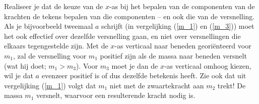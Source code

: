 \begin{exercise}
\begin{oplossing}
Realiseer je dat de keuze van de $x$-as bij het bepalen van de componenten van de krachten de tekens bepalen van die componenten -- en ook die van de versnelling. Als je bijvoorbeeld tweemaal $a$ schrijft (in vergelijking (\ref{m_1}) en (\ref{m_3})) moet het ook effectief over dezelfde versnelling gaan, en niet over versnellingen die elkaars tegengestelde zijn. Met de $x$-as verticaal naar beneden geori\"enteerd voor $m_1$, zal de versnelling voor $m_1$ positief zijn als de massa naar beneden versnelt (wat hij doet; $m_1>m_3$). Voor $m_3$ moet je dan de $x$-as verticaal omhoog kiezen, wil je dat $a$ evenzeer positief is of dus dezelfde betekenis heeft.
\newline
\newline
Zie ook dat uit vergelijking (\ref{m_1}) volgt dat $m_1$ niet met de zwaartekracht aan $m_2$ trekt! De massa $m_1$ versnelt, waarvoor een resulterende kracht nodig is. 
\end{oplossing}

\end{exercise}
